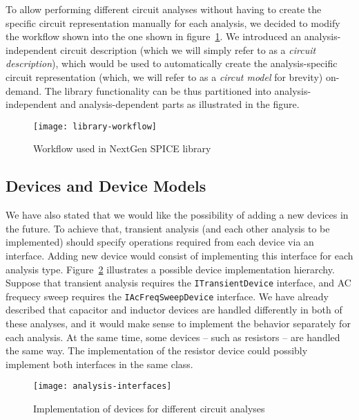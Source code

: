 To allow performing different circuit analyses without having to create the specific circuit representation manually for each analysis, we decided to modify the workflow shown into the one shown in figure~\ref{fig:library-workflow}. We introduced an analysis-independent circuit description (which we will simply refer to as a \textit{circuit description}), which would be used to automatically create the analysis-specific circuit representation (which, we will refer to as a \textit{circut model} for brevity) on-demand. The library functionality can be thus partitioned into analysis-independent and analysis-dependent parts as illustrated in the figure.

\begin{figure}[h]
	\centering
	\texttt{[image: library-workflow]}
	\caption{Workflow used in NextGen SPICE library}
	\label{fig:library-workflow}
\end{figure}

\subsection{Devices and Device Models}
\label{chap:analysis:device-models}
We have also stated that we would like the possibility of adding a new devices in the future. To achieve that, transient analysis (and each other analysis to be implemented) should specify operations required from each device via an interface. Adding new device would consist of implementing this interface for each analysis type. Figure~\ref{fig:analysis-interface} illustrates a possible device implementation hierarchy. Suppose that transient analysis requires the \texttt{ITransientDevice} interface, and AC frequecy sweep requires the \texttt{IAcFreqSweepDevice} interface. We have already described that capacitor and inductor devices are handled differently in both of these analyses, and it would make sense to implement the behavior separately for each analysis. At the same time, some devices -- such as resistors -- are handled the same way. The implementation of the resistor device could possibly implement both interfaces in the same class.

\begin{figure}[h]
	\centering
	\texttt{[image: analysis-interfaces]}
	\caption{Implementation of devices for different circuit analyses}
	\label{fig:analysis-interface}
\end{figure}

